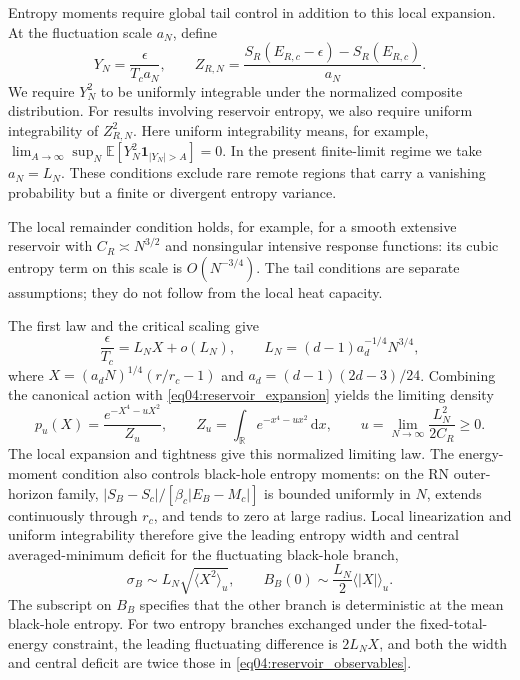 \documentclass[11pt,letterpaper]{article}
\newcommand{\E}{\mathbb{E}}
\newcommand{\dd}{\mathrm{d}}
\theoremstyle{plain}
\theoremstyle{definition}
\theoremstyle{remark}
\begin{document}
Entropy moments require global tail control in addition to this local expansion. At the fluctuation scale $a_N$, define
\begin{equation}
 Y_N=\frac{\epsilon}{T_c a_N},\qquad
 Z_{R,N}=\frac{S_R(E_{R,c}-\epsilon)-S_R(E_{R,c})}{a_N}.
 \label{eq04:tail_variables}
\end{equation}
We require $Y_N^2$ to be uniformly integrable under the normalized composite distribution. For results involving reservoir entropy, we also require uniform integrability of $Z_{R,N}^2$. Here uniform integrability means, for example, $\lim_{A\to\infty}\sup_N\E[Y_N^2\boldsymbol{1}_{|Y_N|>A}]=0$. In the present finite-limit regime we take $a_N=L_N$. These conditions exclude rare remote regions that carry a vanishing probability but a finite or divergent entropy variance.

The local remainder condition holds, for example, for a smooth extensive reservoir with $C_R\asymp N^{3/2}$ and nonsingular intensive response functions: its cubic entropy term on this scale is $O(N^{-3/4})$. The tail conditions are separate assumptions; they do not follow from the local heat capacity.

The first law and the critical scaling give
\begin{equation}
 \frac{\epsilon}{T_c}=L_N X+o(L_N),\qquad
 L_N=(d-1)a_d^{-1/4}N^{3/4},
 \label{eq04:energy_critical_scale}
\end{equation}
where $X=(a_dN)^{1/4}(r/r_c-1)$ and $a_d=(d-1)(2d-3)/24$. Combining the canonical action with \eqref{eq04:reservoir_expansion} yields the limiting density
\begin{equation}
 p_u(X)=\frac{e^{-X^4-uX^2}}{Z_u},\qquad
 Z_u=\int_{\mathbb R}e^{-x^4-ux^2}\,\dd x,\qquad
 u=\lim_{N\to\infty}\frac{L_N^2}{2C_R}\geq0.
 \label{eq04:reservoir_quartic}
\end{equation}
The local expansion and tightness give this normalized limiting law. The energy-moment condition also controls black-hole entropy moments: on the RN outer-horizon family, $|S_B-S_c|/[\beta_c|E_B-M_c|]$ is bounded uniformly in $N$, extends continuously through $r_c$, and tends to zero at large radius. Local linearization and uniform integrability therefore give the leading entropy width and central averaged-minimum deficit for the fluctuating black-hole branch,
\begin{equation}
 \sigma_B\sim L_N\sqrt{\langle X^2\rangle_u},\qquad
 B_B(0)\sim\frac{L_N}{2}\langle |X|\rangle_u.
 \label{eq04:reservoir_observables}
\end{equation}
The subscript on $B_B$ specifies that the other branch is deterministic at the mean black-hole entropy. For two entropy branches exchanged under the fixed-total-energy constraint, the leading fluctuating difference is $2L_NX$, and both the width and central deficit are twice those in \eqref{eq04:reservoir_observables}.
\end{document}
